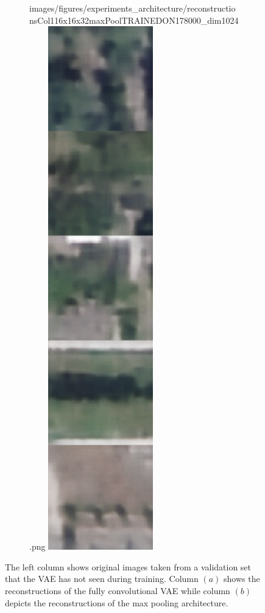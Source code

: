 \begin{figure}[H]
\begin{subfigure}[t]{.19\textwidth}
        {images/figures/experiments_architecture/reconstructionsCol116x16x32maxPoolTRAINEDON178000_dim1024.png}\hfill
        \includegraphics[width=0.5\textwidth]
        {images/figures/experiments_architecture/reconstructionsCol216x16x32maxPoolTRAINEDON178000_dim1024.png}
        \caption{}
    \end{subfigure}
    \caption{The left column shows original images taken from a validation set that the VAE has not seen during
    training. Column $(a)$ shows the reconstructions of the fully convolutional VAE while column $(b)$ 
    depicts the reconstructions of the max pooling architecture.} \label{figure_results_trained_on_all}
\end{figure} 
 

